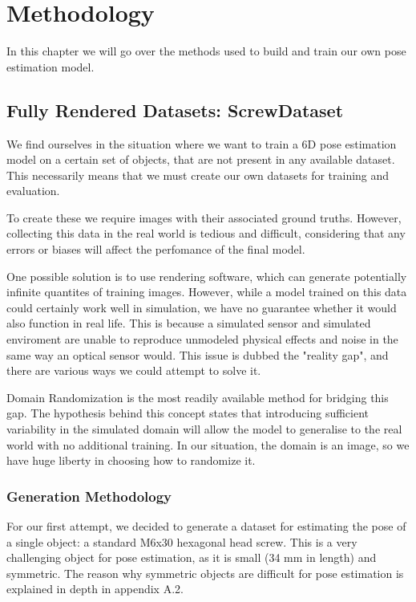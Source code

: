 \chapter{Methodology}

In this chapter we will go over the methods used to build and train our own pose estimation model.

\section{Fully Rendered Datasets: ScrewDataset}

We find ourselves in the situation where we want to train a 6D pose estimation model on a certain set of objects, that are not present in any available dataset. This necessarily means that we must create our own datasets for training and evaluation.

To create these we require images with their associated ground truths. However, collecting this data in the real world is tedious and difficult, considering that any errors or biases will affect the perfomance of the final model. 

One possible solution is to use rendering software, which can generate potentially infinite quantites of training images. However, while a model trained on this data could certainly work well in simulation, we have no guarantee whether it would also function in real life. This is because a simulated sensor and simulated enviroment are unable to reproduce unmodeled physical effects and noise in the same way an optical sensor would. This issue is dubbed the "reality gap"\cite{domainRandomization2}, and there are various ways we could attempt to solve it.

Domain Randomization\cite{domainRandomization} is the most readily available method for bridging this gap. The hypothesis behind this concept states that introducing sufficient variability in the simulated domain will allow the model to generalise to the real world with no additional training. In our situation, the domain is an image, so we have huge liberty in choosing how to randomize it.

\subsection{Generation Methodology}

For our first attempt, we decided to generate a dataset for estimating the pose of a single object: a standard M6x30 hexagonal head screw. This is a very challenging object for pose estimation, as it is small (34 mm in length) and symmetric. The reason why symmetric objects are difficult for pose estimation is explained in depth in appendix A.2.

